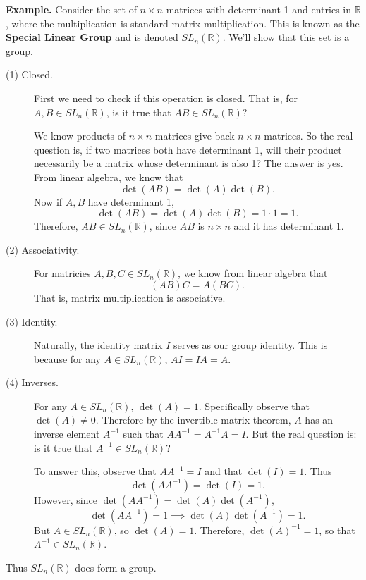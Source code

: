 \noindent
\textbf{Example.}
Consider the set of $n \times n$ matrices with determinant 1 and entries in $\mathbb{R}$, where
the multiplication is standard matrix multiplication. This is
known as the \textbf{Special Linear Group} and is denoted
$SL_n(\mathbb{R})$. We'll show that this set is a group.
\begin{description}
    \item[(1) Closed.] First we need to check if this operation is
    closed. That is, for $A, B \in SL_n(\mathbb{R})$, is it true that
    $AB \in SL_n(\mathbb{R})$?

    We know products of $n \times n$ matrices give
    back $n \times n$ matrices. So the real question is, 
    if two matrices both have
    determinant 1, will their product necessarily be a matrix
    whose determinant is also 1? 
    The answer is yes. From linear algebra, we know that 
    \[
        \det(AB) = \det(A)\det(B).
    \]
    Now if $A, B$ have determinant 1, 
    \[
        \det(AB) = \det(A)\det(B) = 1 \cdot 1 = 1.   
    \]
    Therefore, $AB \in SL_n(\mathbb{R})$, since $AB$ is $n \times n$
    and it has determinant 1.


    \item[(2) Associativity.] For matricies $A, B, C \in
    SL_n(\mathbb{R})$, we know from linear algebra that 
    \[
        (AB)C = A(BC).
    \]
    That is, matrix multiplication is associative.

    \item[(3) Identity.] Naturally, the identity matrix $I$ serves as
    our group identity. This is because for any $A \in
    SL_n(\mathbb{R})$, $AI = IA = A$.

    \item[(4) Inverses.] For any $A \in SL_n(\mathbb{R})$, $\det(A) =
    1$. Specifically observe that $\det(A) \ne 0$. Therefore by the 
    invertible matrix theorem, $A$
    has an inverse element $A^{-1}$ such that $AA^{-1} = A^{-1}A = I$.
    But the real question is: is it true that $A^{-1} \in SL_n(\mathbb{R})$? 
    
    To answer this, observe that $AA^{-1} = I$
    and that $\det(I) = 1$. Thus 
    \[ 
        \det(AA^{-1}) = \det(I) = 1.
    \]
    However, since $\det(AA^{-1}) = \det(A)\det(A^{-1})$,
    \[
        \det(AA^{-1}) = 1 \implies \det(A)\det(A^{-1}) = 1.
    \] 
    But $A \in SL_n(\mathbb{R})$, so $\det(A) = 1$. Therefore,
    $\det(A)^{-1} = 1$, so that $A^{-1} \in SL_n(\mathbb{R})$. 
\end{description}
Thus $SL_n(\mathbb{R})$ does form a group. 


